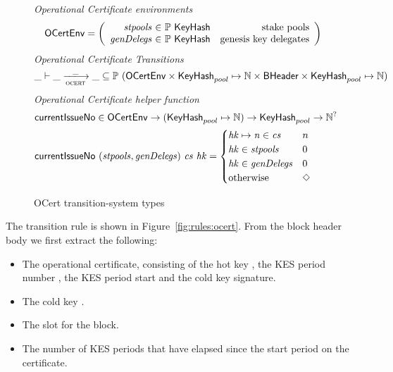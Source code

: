 \begin{figure}
  \emph{Operational Certificate environments}
  \begin{equation*}
    \OCertEnv =
    \left(
      \begin{array}{r@{~\in~}lr}
        \var{stpools} & \powerset{\type{KeyHash}} & \text{stake pools} \\
        \var{genDelegs} & \powerset{\type{KeyHash}} & \text{genesis key delegates}\\
      \end{array}
    \right)
  \end{equation*}
  \emph{Operational Certificate Transitions}
  \begin{equation*}
    \var{\_} \vdash \var{\_} \trans{ocert}{\_} \var{\_} \subseteq
    \powerset (\OCertEnv \times \KeyHash_{pool} \mapsto \N \times \BHeader \times \KeyHash_{pool} \mapsto \N)
  \end{equation*}
  \emph{Operational Certificate helper function}
  \begin{align*}
      & \mathsf{currentIssueNo} \in \mathsf{OCertEnv} \to (\mathsf{KeyHash}_{pool} \mapsto \mathbb{N})
                                           \to \mathsf{KeyHash}_{pool}
                                           \to \mathbb{N}^? \\
      & \mathsf{currentIssueNo}~(\mathit{stpools}, \mathit{genDelegs})~ \mathit{cs} ~\mathit{hk} =
      \begin{cases}
        \mathit{hk}\mapsto \mathit{n} \in \mathit{cs} & n \\
        \mathit{hk} \in \mathit{stpools} & 0 \\
        \mathit{hk} \in \mathit{genDelegs} & 0 \\
        \text{otherwise} & \Diamond
      \end{cases}
  \end{align*}
  \caption{OCert transition-system types}
  \label{fig:ts-types:ocert}
\end{figure}

The transition rule is shown in Figure~\ref{fig:rules:ocert}. From the block
header body  we first extract the following:

\begin{itemize}
  \item The operational certificate, consisting of the hot key ,
    the KES period number , the KES period start  and the cold key
  signature.
\item The cold key .
\item The slot  for the block.
\item The number of KES periods that have elapsed since the start period on the certificate.
\end{itemize}

